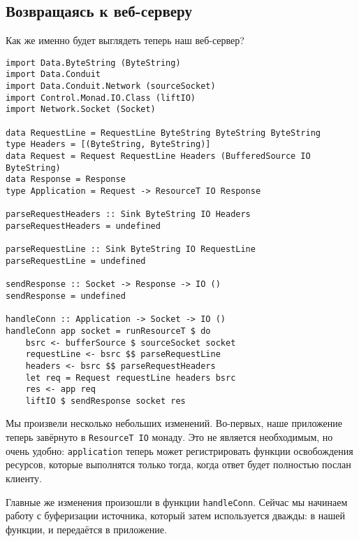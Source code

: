 \subsection{Возвращаясь к веб-серверу}
Как же именно будет выглядеть теперь наш веб-сервер?
\begin{lstlisting}
import Data.ByteString (ByteString)
import Data.Conduit
import Data.Conduit.Network (sourceSocket)
import Control.Monad.IO.Class (liftIO)
import Network.Socket (Socket)

data RequestLine = RequestLine ByteString ByteString ByteString
type Headers = [(ByteString, ByteString)]
data Request = Request RequestLine Headers (BufferedSource IO ByteString)
data Response = Response
type Application = Request -> ResourceT IO Response

parseRequestHeaders :: Sink ByteString IO Headers
parseRequestHeaders = undefined

parseRequestLine :: Sink ByteString IO RequestLine
parseRequestLine = undefined

sendResponse :: Socket -> Response -> IO ()
sendResponse = undefined

handleConn :: Application -> Socket -> IO ()
handleConn app socket = runResourceT $ do
    bsrc <- bufferSource $ sourceSocket socket
    requestLine <- bsrc $$ parseRequestLine
    headers <- bsrc $$ parseRequestHeaders
    let req = Request requestLine headers bsrc
    res <- app req
    liftIO $ sendResponse socket res
\end{lstlisting}

Мы произвели несколько небольших изменений. Во-первых, наше приложение теперь завёрнуто в
\lstinline=ResourceT IO= монаду. Это не является необходимым, но очень удобно:
\lstinline{application} теперь может регистрировать функции освобождения ресурсов,
которые выполнятся только тогда, когда ответ будет полностью послан клиенту.

Главные же изменения произошли в функции \lstinline=handleConn=. Сейчас мы начинаем работу
с буферизации источника, который затем используется дважды: в нашей функции, и передаётся в
приложение.

